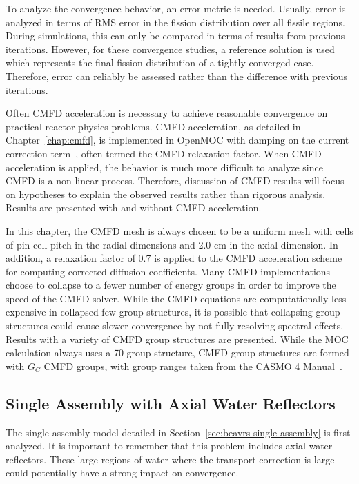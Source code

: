 To analyze the convergence behavior, an error metric is needed. Usually, error is analyzed in terms of RMS error in the fission distribution over all fissile regions. During simulations, this can only be compared in terms of results from previous iterations. However, for these convergence studies, a reference solution is used which represents the final fission distribution of a tightly converged case. Therefore, error can reliably be assessed rather than the difference with previous iterations.

Often \ac{CMFD} acceleration is necessary to achieve reasonable convergence on practical reactor physics problems. \ac{CMFD} acceleration, as detailed in Chapter~\ref{chap:cmfd}, is implemented in OpenMOC with damping on the current correction term~\cite{smith2002casmo}, often termed the \ac{CMFD} relaxation factor. When \ac{CMFD} acceleration is applied, the behavior is much more difficult to analyze since \ac{CMFD} is a non-linear process. Therefore, discussion of \ac{CMFD} results will focus on hypotheses to explain the observed results rather than rigorous analysis. Results are presented with and without \ac{CMFD} acceleration.

In this chapter, the \ac{CMFD} mesh is always chosen to be a uniform mesh with cells of pin-cell pitch in the radial dimensions and 2.0 cm in the axial dimension. In addition, a relaxation factor of 0.7 is applied to the \ac{CMFD} acceleration scheme for computing corrected diffusion coefficients. Many \ac{CMFD} implementations choose to collapse to a fewer number of energy groups in order to improve the speed of the CMFD solver. While the \ac{CMFD} equations are computationally less expensive in collapsed few-group structures, it is possible that collapsing group structures could cause slower convergence by not fully resolving spectral effects. Results with a variety of \ac{CMFD} group structures are presented. While the \ac{MOC} calculation always uses a 70 group structure, \ac{CMFD} group structures are formed with $G_C$ \ac{CMFD} groups, with group ranges taken from the CASMO 4 Manual~\cite{edenius1995casmo}.

\subsection{Single Assembly with Axial Water Reflectors}
\label{sec:sa-axial-ref}

The single assembly model detailed in Section~\ref{sec:beavrs-single-assembly} is first analyzed. It is important to remember that this problem includes axial water reflectors. These large regions of water where the transport-correction is large could potentially have a strong impact on convergence.


